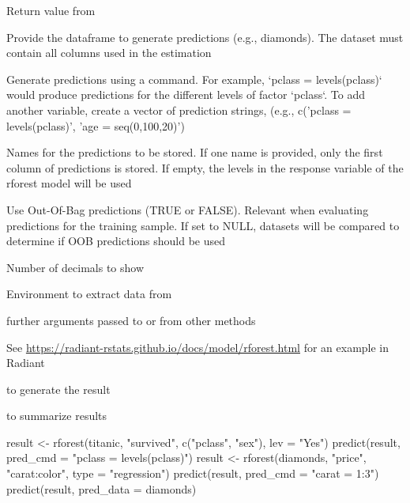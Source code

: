 \documentclass[a4paper]{book}
\begin{document}
\begin{Arguments}
\begin{ldescription}
\item[\code{object}] Return value from 

\item[\code{pred\_data}] Provide the dataframe to generate predictions (e.g., diamonds). The dataset must contain all columns used in the estimation

\item[\code{pred\_cmd}] Generate predictions using a command. For example, `pclass = levels(pclass)` would produce predictions for the different
levels of factor `pclass`. To add another variable, create a vector of prediction strings, (e.g., c('pclass = levels(pclass)', 'age = seq(0,100,20)')

\item[\code{pred\_names}] Names for the predictions to be stored. If one name is provided, only the first column of predictions is stored. If empty, the levels
in the response variable of the rforest model will be used

\item[\code{OOB}] Use Out-Of-Bag predictions (TRUE or FALSE). Relevant when evaluating predictions for the training sample. If set to NULL, datasets will be compared
to determine if OOB predictions should be used

\item[\code{dec}] Number of decimals to show

\item[\code{envir}] Environment to extract data from

\item[\code{...}] further arguments passed to or from other methods
\end{ldescription}
\end{Arguments}
%
\begin{Details}
See \url{https://radiant-rstats.github.io/docs/model/rforest.html} for an example in Radiant
\end{Details}
%
\begin{SeeAlso}
 to generate the result

 to summarize results
\end{SeeAlso}
%
\begin{Examples}
\begin{ExampleCode}
result <- rforest(titanic, "survived", c("pclass", "sex"), lev = "Yes")
predict(result, pred_cmd = "pclass = levels(pclass)")
result <- rforest(diamonds, "price", "carat:color", type = "regression")
predict(result, pred_cmd = "carat = 1:3")
predict(result, pred_data = diamonds) %

\end{ExampleCode}
\end{Examples}
\end{document}
